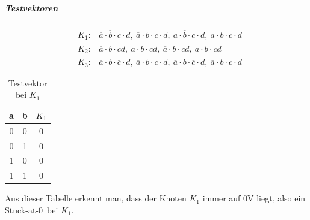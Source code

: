 \documentclass[10pt]{scrreprt}
\begin{document}
    \subparagraph{Testvektoren}
    \begin{eqnarray*}
        &K_1:& \overline{a} \cdot \overline{b} \cdot c \cdot d,\ \overline{a} \cdot b \cdot c \cdot d,\ a \cdot \overline{b} \cdot c \cdot d,\ a \cdot b \cdot c \cdot d\\
        &K_2:& \overline{a} \cdot \overline{b} \cdot \overline{cd},\ a \cdot \overline{b} \cdot \overline{cd},\ \overline{a} \cdot b \cdot \overline{cd},\ a \cdot b \cdot \overline{cd}\\
        &K_3:& \overline{a} \cdot b \cdot \overline{c} \cdot \overline{d},\ \overline{a} \cdot b \cdot c \cdot \overline{d},\ \overline{a} \cdot b \cdot \overline{c} \cdot d,\ \overline{a} \cdot b \cdot c \cdot d
    \end{eqnarray*}

    \begin{table}[H]
        \centering
        \begin{tabular}{cc|c}
            \toprule
            a & b & $K_1$\\
            \midrule
            0 & 0 & 0\\
            0 & 1 & 0\\
            1 & 0 & 0\\
            1 & 1 & 0\\
            \bottomrule
        \end{tabular}
        \caption{Testvektor bei $K_1$}
    \end{table}

    Aus dieser Tabelle erkennt man, dass der Knoten $K_1$ immer auf 0V liegt, also
    ein \glqq Stuck-at-0\grqq~bei $K_1$.
\end{document}
